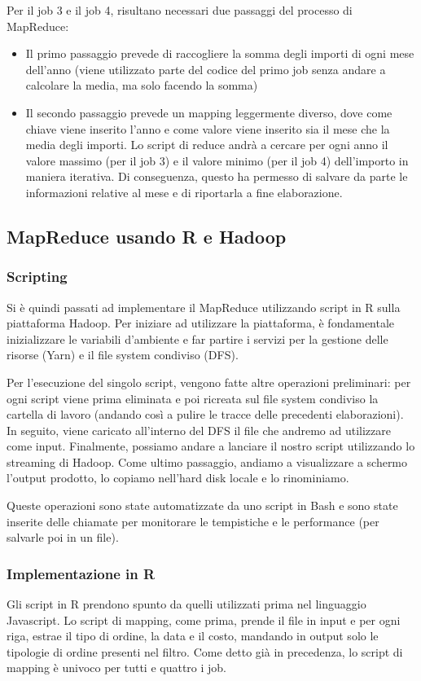 Per il job 3 e il job 4, risultano necessari due passaggi del processo di MapReduce:
\begin{itemize}
    \item Il primo passaggio prevede di raccogliere la somma degli importi di ogni mese dell'anno (viene utilizzato parte del codice del primo job senza andare a calcolare la media, ma solo facendo la somma)
    \item Il secondo passaggio prevede un mapping leggermente diverso, dove come chiave viene inserito l'anno e come valore viene inserito sia il mese che la media degli importi. Lo script di reduce andrà a cercare per ogni anno il valore massimo (per il job 3) e il valore minimo (per il job 4) dell'importo in maniera iterativa. Di conseguenza, questo ha permesso di salvare da parte le informazioni relative al mese e di riportarla a fine elaborazione.
\end{itemize}
\subsection{MapReduce usando R e Hadoop}
\subsubsection{Scripting}
Si è quindi passati ad implementare il MapReduce utilizzando script in R sulla piattaforma Hadoop. Per iniziare ad utilizzare la piattaforma, è fondamentale inizializzare le variabili d'ambiente e far partire i servizi per la gestione delle risorse (Yarn) e il file system condiviso (DFS).

Per l'esecuzione del singolo script, vengono fatte altre operazioni preliminari: per ogni script viene prima eliminata e poi ricreata sul file system condiviso la cartella di lavoro (andando così a pulire le tracce delle precedenti elaborazioni). In seguito, viene caricato all'interno del DFS il file che andremo ad utilizzare come input. Finalmente, possiamo andare a lanciare il nostro script utilizzando lo streaming di Hadoop. Come ultimo passaggio, andiamo a visualizzare a schermo l'output prodotto, lo copiamo nell'hard disk locale e lo rinominiamo.

Queste operazioni sono state automatizzate da uno script in Bash e sono state inserite delle chiamate per monitorare le tempistiche e le performance (per salvarle poi in un file).
\subsubsection{Implementazione in R}
Gli script in R prendono spunto da quelli utilizzati prima nel linguaggio Javascript. Lo script di mapping, come prima, prende il file in input e per ogni riga, estrae il tipo di ordine, la data e il costo, mandando in output solo le tipologie di ordine presenti nel filtro. Come detto già in precedenza, lo script di mapping è univoco per tutti e quattro i job.


